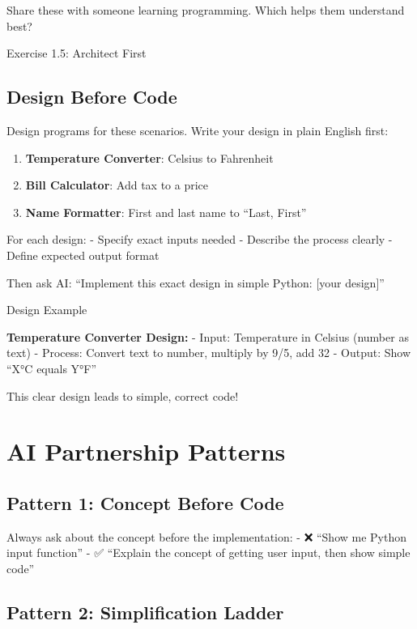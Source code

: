 \documentclass[
  letterpaper,
  DIV=11,
  numbers=noendperiod,
  oneside]{scrreprt}
\providecommand{\tightlist}{%
  \setlength{\itemsep}{0pt}\setlength{\parskip}{0pt}}\usepackage{longtable,booktabs,array}
\begin{document}
Share these with someone learning programming. Which helps them
understand best?

Exercise 1.5: Architect First

\subsection{Design Before Code}\label{design-before-code}

Design programs for these scenarios. Write your design in plain English
first:

\begin{enumerate}
\def\labelenumi{\arabic{enumi}.}
\tightlist
\item
  \textbf{Temperature Converter}: Celsius to Fahrenheit
\item
  \textbf{Bill Calculator}: Add tax to a price
\item
  \textbf{Name Formatter}: First and last name to ``Last, First''
\end{enumerate}

For each design: - Specify exact inputs needed - Describe the process
clearly - Define expected output format

Then ask AI: ``Implement this exact design in simple Python: {[}your
design{]}''

Design Example

\textbf{Temperature Converter Design:} - Input: Temperature in Celsius
(number as text) - Process: Convert text to number, multiply by 9/5, add
32 - Output: Show ``X°C equals Y°F''

This clear design leads to simple, correct code!

\section{AI Partnership Patterns}\label{ai-partnership-patterns}

\subsection{Pattern 1: Concept Before
Code}\label{pattern-1-concept-before-code}

Always ask about the concept before the implementation: - ❌ ``Show me
Python input function'' - ✅ ``Explain the concept of getting user
input, then show simple code''

\subsection{Pattern 2: Simplification
Ladder}\label{pattern-2-simplification-ladder}
\end{document}
